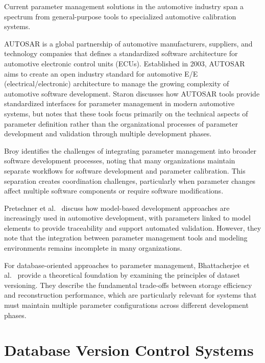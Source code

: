 Current parameter management solutions in the automotive industry span a spectrum from general-purpose tools to specialized automotive calibration systems. 

\ac{AUTOSAR} is a global partnership of automotive manufacturers, suppliers, and technology companies that defines a standardized software architecture for automotive electronic control units (ECUs). Established in 2003, \ac{AUTOSAR} aims to create an open industry standard for automotive E/E (electrical/electronic) architecture to manage the growing complexity of automotive software development. Staron \cite{staron2021automotive} discusses how \ac{AUTOSAR} tools provide standardized interfaces for parameter management in modern automotive systems, but notes that these tools focus primarily on the technical aspects of parameter definition rather than the organizational processes of parameter development and validation through multiple development phases.

Broy \cite{broy2006challenges} identifies the challenges of integrating parameter management into broader software development processes, noting that many organizations maintain separate workflows for software development and parameter calibration. This separation creates coordination challenges, particularly when parameter changes affect multiple software components or require software modifications.

Pretschner et al.\ \cite{pretschner2007software} discuss how model-based development approaches are increasingly used in automotive development, with parameters linked to model elements to provide traceability and support automated validation. However, they note that the integration between parameter management tools and modeling environments remains incomplete in many organizations.

For database-oriented approaches to parameter management, Bhattacherjee et al.\ \cite{bhattacherjee2015principles} provide a theoretical foundation by examining the principles of dataset versioning. They describe the fundamental trade-offs between storage efficiency and reconstruction performance, which are particularly relevant for systems that must maintain multiple parameter configurations across different development phases.

\section{Database Version Control Systems}
\label{sec:database-version-control}

